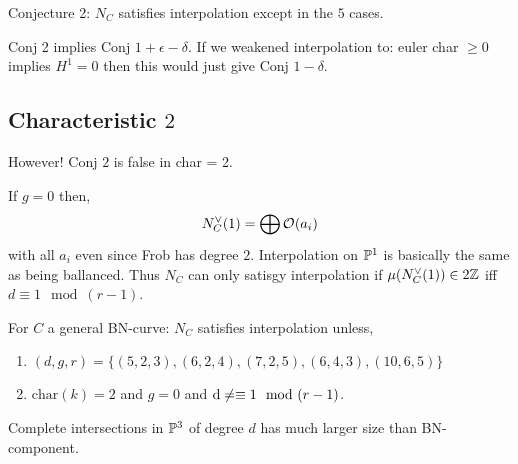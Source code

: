 \documentclass[12pt]{article}
\begin{document}
Conjecture 2: $N_C$ satisfies interpolation except in the $5$ cases.

\begin{rmk}
Conj 2 implies Conj $1+\epsilon-\delta$. If we weakened interpolation to: euler char $\ge 0$ implies $H^1 = 0$ then this would just give Conj $1 - \delta$.
\end{rmk} 

\subsection{Characteristic $2$}

However! Conj $2$ is false in char = 2.

\begin{center}
\end{center}
If $g = 0$ then,
\[ N_C^\vee(1) = \bigoplus \struct{}(a_i) \]
with all $a_i$ even since Frob has degree $2$. Interpolation on $\P^1$ is basically the same as being ballanced. Thus $N_C$ can only satisgy interpolation if $\mu(N^\vee_C(1)) \in 2 \Z$ iff $d \equiv 1 \mod (r-1)$. 

\begin{theorem}[L, Vogt]
For $C$ a general BN-curve: $N_C$ satisfies interpolation unless,
\begin{enumerate}
\item $(d,g,r) = \{ (5,2,3), (6,2,4), (7,2,5), (6,4,3), (10,6,5) \}$

\item $\mathrm{char}(k) = 2$ and $g = 0$ and $\d \neq\equiv 1 \mod (r-1)$.
\end{enumerate}
\end{theorem} 


\begin{rmk}
Complete intersections in $\P^3$ of degree $d$ has much larger size than BN-component. 
\end{rmk}
\end{document}
